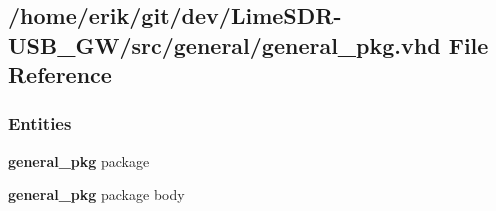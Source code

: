 \subsection{/home/erik/git/dev/\+Lime\+S\+D\+R-\/\+U\+S\+B\+\_\+\+G\+W/src/general/general\+\_\+pkg.vhd File Reference}
\label{general__pkg_8vhd}
\subsubsection*{Entities}
\begin{DoxyCompactItemize}
\item 
{\bf general\+\_\+pkg} package
\item 
{\bf general\+\_\+pkg} package body
\end{DoxyCompactItemize}
